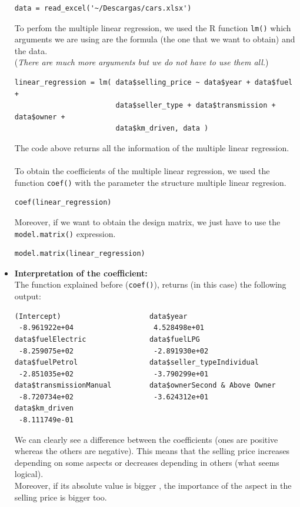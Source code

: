 \documentclass{article}
\begin{document}
\begin{itemize}
\begin{verbatim}
data = read_excel('~/Descargas/cars.xlsx')
\end{verbatim}
To perfom the multiple linear regression, we used the R function \texttt{lm()} which arguments we are using are the formula (the one that we want to obtain) and the data. \\ 
(\textit{There are much more arguments but we do not have to use them all.})
    \begin{verbatim}
linear_regression = lm( data$selling_price ~ data$year + data$fuel + 
                        data$seller_type + data$transmission + data$owner + 
                        data$km_driven, data )
    \end{verbatim}
The code above returns all the information of the multiple linear regression. \\\\
To obtain the coefficients of the multiple linear regression, we used the function \texttt{coef()} with the parameter the structure multiple linear regresion.
    \begin{verbatim}
coef(linear_regression)
    \end{verbatim}
Moreover, if we want to obtain the design matrix, we just have to use the \texttt{model.matrix()} expression.
    \begin{verbatim}
model.matrix(linear_regression)
    \end{verbatim}
    \item \textbf{Interpretation of the coefficient:} \\
    The function explained before (\texttt{coef()}), returns (in this case) the following output:
    \begin{verbatim}
(Intercept)                     data$year 
 -8.961922e+04                   4.528498e+01 
data$fuelElectric               data$fuelLPG 
 -8.259075e+02                   -2.891930e+02 
data$fuelPetrol                 data$seller_typeIndividual 
 -2.851035e+02                   -3.790299e+01 
data$transmissionManual         data$ownerSecond & Above Owner 
 -8.720734e+02                   -3.624312e+01 
data$km_driven 
 -8.111749e-01 
    \end{verbatim}
We can clearly see a difference between the coefficients (ones are positive whereas the others are negative). This means that the selling price increases depending on some aspects or decreases depending  in others (what seems logical).\\
Moreover, if its absolute value is bigger , the importance of the aspect in the selling price is bigger too. \\

\end{itemize}
\end{document}
